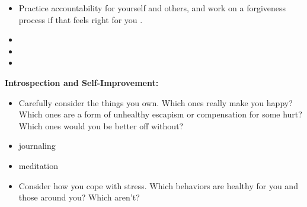 \documentclass[12pt,letterpaper]{article}
\begin{document}
\begin{itemize}
    \item Practice accountability for yourself and others, and work on a forgiveness process if that feels right for you \cite{mingusAccountability,barnardCommunities,gottmanTrust}.  
    \item {}
    \item {} 
    \item {}
\end{itemize}
\noindent \textbf{Introspection and Self-Improvement:} 
\begin{itemize}
    \item Carefully consider the things you own. Which ones really make you happy? Which ones are a form of unhealthy escapism or compensation for some hurt? Which ones would you be better off without? 
    \item journaling
    \item meditation
    \item Consider how you cope with stress. Which behaviors are healthy for you and those around you? Which aren't?
\end{itemize}
\end{document}

